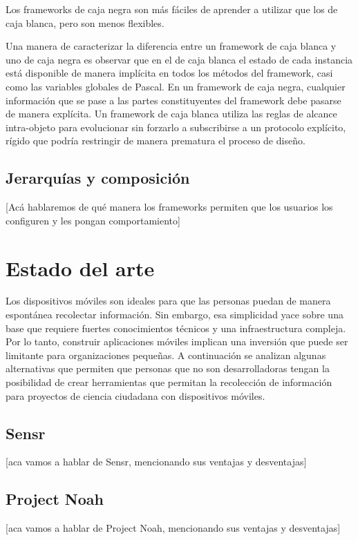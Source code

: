 	Los frameworks de caja negra son más fáciles de aprender a utilizar que los de caja blanca, pero son menos flexibles. 
	
	Una manera de caracterizar la diferencia entre un framework de caja blanca y uno de caja negra es observar que en el de caja blanca el estado de cada instancia está disponible de manera implícita en todos los métodos del framework, casi como las variables globales de Pascal. En un framework de caja negra, cualquier información que se pase a las partes constituyentes del framework debe pasarse de manera explícita. Un framework de caja blanca utiliza las reglas de alcance intra-objeto para evolucionar sin forzarlo a subscribirse a un protocolo explícito, rígido que podría restringir de manera prematura el proceso de diseño.
 \cite{johnson1988designing}

\subsection{Jerarquías y composición}
[Acá hablaremos de qué manera los frameworks permiten que los usuarios los configuren y les pongan comportamiento]



\section{Estado del arte}
Los dispositivos móviles son ideales para que las personas puedan de manera espontánea recolectar información. Sin embargo, esa simplicidad yace sobre una base que requiere fuertes conocimientos técnicos y una infraestructura compleja. Por lo tanto, construir aplicaciones móviles implican una inversión que puede ser limitante para organizaciones pequeñas. A continuación se analizan algunas alternativas que permiten que personas que no son desarrolladoras tengan la posibilidad de crear herramientas que permitan la recolección de información para proyectos de ciencia ciudadana con dispositivos móviles. \cite{kim2013sensr}

\subsection{Sensr}
[aca vamos a hablar de Sensr, mencionando sus ventajas y desventajas]

\subsection{Project Noah}
[aca vamos a hablar de Project Noah, mencionando sus ventajas y desventajas]

